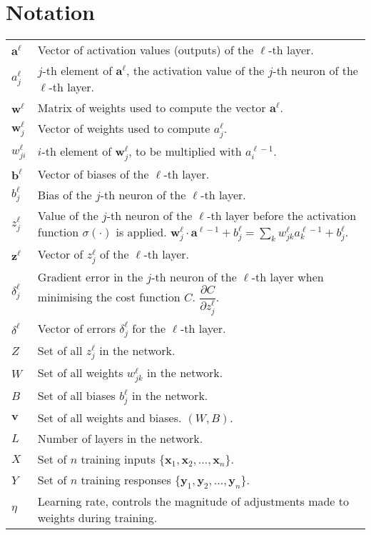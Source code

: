 \section*{Notation}

\begin{tabular}{p{1cm}p{13cm}}
$\mathbf{a}^\ell$ & Vector of activation values (outputs) of the $\ell$-th layer.\\
$a_j^\ell$ & $j$-th element of $\mathbf{a}^\ell$, the activation value of the $j$-th neuron of the $\ell$-th layer.\\
$\mathbf{w}^\ell$ & Matrix of weights used to compute the vector $\mathbf{a}^\ell$.\\
$\mathbf{w}^\ell_j$ & Vector of weights used to compute $a_j^\ell$.\\
$w_{ji}^\ell$ & $i$-th element of $\mathbf{w}^\ell_j$, to be multiplied with $a_i^{\ell-1}$.\\
$\mathbf{b}^\ell$ & Vector of biases of the $\ell$-th layer.\\
$b_j^\ell$ & Bias of the $j$-th neuron of the $\ell$-th layer.\\
$z_j^\ell$ & Value of the $j$-th neuron of the $\ell$-th layer before the activation function $\sigma(\cdot)$ is applied. $\mathbf{w}_j^\ell\cdot \mathbf{a}^{\ell-1} + b_j^\ell= \sum_k w_{jk}^\ell a_k^{\ell-1} + b_j^\ell$.\\
$\mathbf{z}^\ell$ & Vector of $z_j^\ell$ of the $\ell$-th layer.\\
$\delta_j^\ell$ & Gradient error in the $j$-th neuron of the $\ell$-th layer when minimising the cost function $C$. $\dfrac{\partial C}{\partial z_j^\ell}$.\\
$\delta^\ell$ & Vector of errors $\delta_j^\ell$ for the $\ell$-th layer.\\
$Z$ & Set of all $z_j^\ell$ in the network. \\
$W$ & Set of all weights $w_{jk}^\ell$ in the network.\\
$B$ & Set of all biases $b_j^\ell$ in the network. \\
$\mathbf{v}$ & Set of all weights and biases. $(W,B)$.\\
$L$ & Number of layers in the network.\\
$X$ & Set of $n$ training inputs $\{\mathbf{x}_1, \mathbf{x}_2, \ldots, \mathbf{x}_n\}$. \\
$Y$ & Set of $n$ training responses $\{\mathbf{y}_1, \mathbf{y}_2, \ldots, \mathbf{y}_n\}$.\\
$\eta$ & Learning rate, controls the magnitude of adjustments made to weights during training.
\end{tabular}